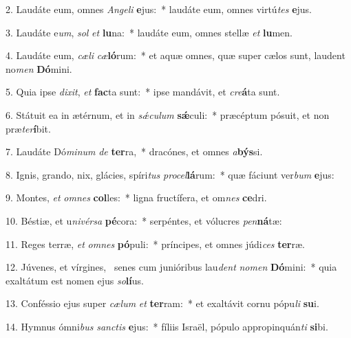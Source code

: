 2. Laudáte eum, omnes \textit{An}\textit{ge}\textit{li} \textbf{e}jus:~*  laudáte eum, omnes virtú\textit{tes} \textbf{e}jus.\

3. Laudáte e\textit{um}, \textit{sol} \textit{et} \textbf{lu}na:~*  laudáte eum, omnes stellæ \textit{et} \textbf{lu}men.\

4. Laudáte eum, \textit{cæ}\textit{li} \textit{cæ}\textbf{ló}rum:~*  et aquæ omnes, quæ super cælos sunt, laudent no\textit{men} \textbf{Dó}mini.\

5. Quia ipse \textit{di}\textit{xit}, \textit{et} \textbf{fac}ta sunt:~*  ipse mandávit, et \textit{cre}\textbf{á}ta sunt.\

6. Státuit ea in ætérnum, et in \textit{sǽ}\textit{cu}\textit{lum} \textbf{sǽ}culi:~*  præcéptum pósuit, et non præ\textit{ter}\textbf{í}bit.\

7. Laudáte Dó\textit{mi}\textit{num} \textit{de} \textbf{ter}ra,~*  dracónes, et omnes \textit{a}\textbf{býs}si.\

8. Ignis, grando, nix, glácies, spíri\textit{tus} \textit{pro}\textit{cel}\textbf{lá}rum:~*  quæ fáciunt ver\textit{bum} \textbf{e}jus:\

9. Montes, \textit{et} \textit{om}\textit{nes} \textbf{col}les:~*  ligna fructífera, et om\textit{nes} \textbf{ce}dri.\

10. Béstiæ, et u\textit{ni}\textit{vér}\textit{sa} \textbf{pé}cora:~*  serpéntes, et vólucres \textit{pen}\textbf{ná}tæ:\

11. Reges terræ, \textit{et} \textit{om}\textit{nes} \textbf{pó}puli:~*  príncipes, et omnes júdi\textit{ces} \textbf{ter}ræ.\

12. Júvenes, et vírgines, \dag\  senes cum junióribus lau\textit{dent} \textit{no}\textit{men} \textbf{Dó}mini:~*  quia exaltátum est nomen ejus \textit{so}\textbf{lí}us.\

13. Conféssio ejus super \textit{cæ}\textit{lum} \textit{et} \textbf{ter}ram:~*  et exaltávit cornu pópu\textit{li} \textbf{su}i.\

14. Hymnus ómni\textit{bus} \textit{sanc}\textit{tis} \textbf{e}jus:~*  fíliis Israël, pópulo appropinquán\textit{ti} \textbf{si}bi.\

